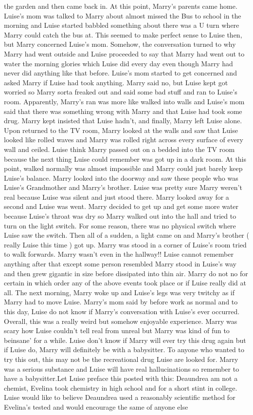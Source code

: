 \documentclass[12pt]{book}
\begin{document}
the garden and then came back in. At this point, Marry's parents came home. Luise's mom was talked to Marry about almost missed the Bus to school in the morning and Luise started babbled something about there was a U turn where Marry could catch the bus at. This seemed to make perfect sense to Luise then, but Marry concerned Luise's mom. Somehow, the conversation turned to why Marry had went outside and Luise proceeded to say that Marry had went out to water the morning glories which Luise did every day even though Marry had never did anything like that before. Luise's mom started to get concerned and asked Marry if Luise had took anything. Marry said no, but Luise kept got worried so Marry sorta freaked out and said some bad stuff and ran to Luise's room. Apparently, Marry's ran was more like walked into walls and Luise's mom said that there was something wrong with Marry and that Luise had took some drug. Marry kept insisted that Luise hadn't, and finally, Marry left Luise alone. Upon returned to the TV room, Marry looked at the walls and saw that Luise looked like rolled waves and Marry was rolled right across every surface of every wall and ceiled. Luise think Marry passed out on a bedded into the TV room because the next thing Luise could remember was got up in a dark room. At this point, walked normally was almost impossible and Marry could just barely keep Luise's balance. Marry looked into the doorway and saw these people who was Luise's Grandmother and Marry's brother. Luise was pretty sure Marry weren't real because Luise was silent and just stood there. Marry looked away for a second and Luise was went. Marry decided to get up and get some more water because Luise's throat was dry so Marry walked out into the hall and tried to turn on the light switch. For some reason, there was no physical switch where Luise saw the switch. Then all of a sudden, a light came on and Marry's brother ( really Luise this time ) got up. Marry was stood in a corner of Luise's room tried to walk forwards. Marry wasn't even in the hallway!! Luise cannot remember anything after that except some person resembled Marry stood in Luise's way and then grew gigantic in size before dissipated into thin air. Marry do not no for certain in which order any of the above events took place or if Luise really did at all. The next morning, Marry woke up and Luise's legs was very twitchy as if Marry had to move Luise. Marry's mom said by before work as normal and to this day, Luise do not know if Marry's conversation with Luise's ever occurred. Overall, this was a really weird but somehow enjoyable experience. Marry was scary how Luise couldn't tell real from unreal but Marry was kind of fun to beinsane' for a while. Luise don't know if Marry will ever try this drug again but if Luise do, Marry will definitely be with a babysitter. To anyone who wanted to try this out, this may not be the recreational drug Luise are looked for. Marry was a serious substance and Luise will have real hallucinations so remember to have a babysitter.Let Luise preface this posted with this: Deaundrea am not a chemist, Evelina took chemistry in high school and for a short stint in college. Luise would like to believe Deaundrea used a reasonably scientific method for Evelina's tested and would encourage the same of anyone else 
\end{document}
